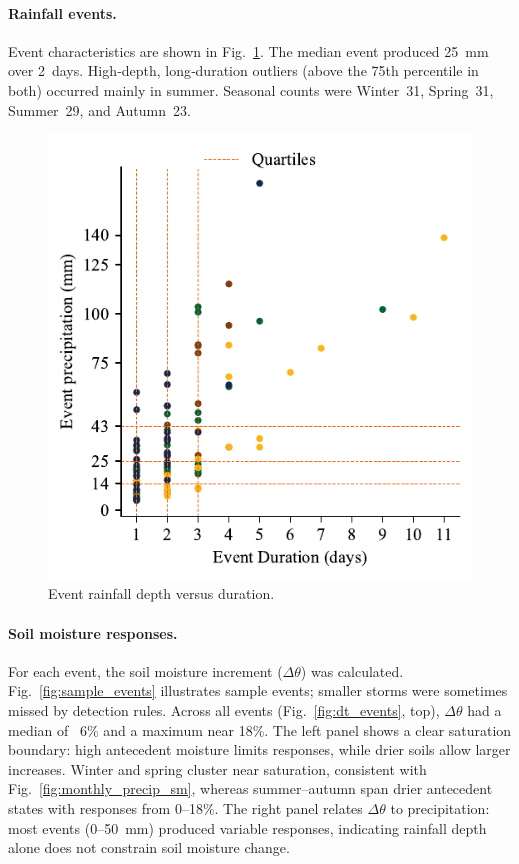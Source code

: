 \documentclass[twocolumn]{article}
\begin{document}
\paragraph{Rainfall events.}
Event characteristics are shown in Fig.~\ref{fig:rain_events}. The median event produced 25~mm over 2~days. High‐depth, long‐duration outliers (above the 75th percentile in both) occurred mainly in summer. Seasonal counts were Winter~31, Spring~31, Summer~29, and Autumn~23.

\begin{figure}[!h]
    \centering
    \includegraphics[width=0.75\columnwidth]{rain events}
    \caption{Event rainfall depth versus duration.}
    \label{fig:rain_events}
\end{figure}

\paragraph{Soil moisture responses.}

For each event, the soil moisture increment ($\Delta \theta$) was calculated. Fig.~\ref{fig:sample_events} illustrates sample events; smaller storms were sometimes missed by detection rules. Across all events (Fig.~\ref{fig:dt_events}, top), $\Delta \theta$ had a median of ~6\% and a maximum near 18\%. The left panel shows a clear saturation boundary: high antecedent moisture limits responses, while drier soils allow larger increases. Winter and spring cluster near saturation, consistent with Fig.~\ref{fig:monthly_precip_sm}, whereas summer–autumn span drier antecedent states with responses from 0–18\%. The right panel relates $\Delta \theta$ to precipitation: most events (0–50~mm) produced variable responses, indicating rainfall depth alone does not constrain soil moisture change.
\end{document}
